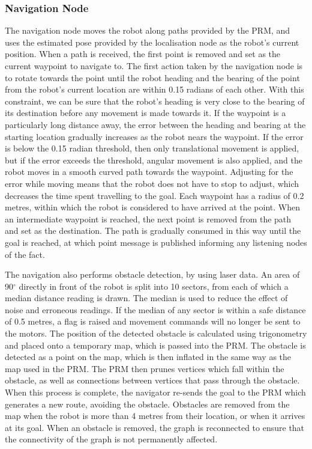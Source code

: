 \documentclass[conference]{IEEEtran}
\begin{document}
\subsubsection{Navigation Node}
The navigation node moves the robot along paths provided by the PRM, and uses the estimated pose provided by the localisation node as the robot's current position. When a path is received, the first point is removed and set as the current waypoint to navigate to. The first action taken by the navigation node is to rotate towards the point until the robot heading and the bearing of the point from the robot's current location are within 0.15 radians of each other. With this constraint, we can be sure that the robot's heading is very close to the bearing of its destination before any movement is made towards it. If the waypoint is a particularly long distance away, the error between the heading and bearing at the starting location gradually increases as the robot nears the waypoint. If the error is below the 0.15 radian threshold, then only translational movement is applied, but if the error exceeds the threshold, angular movement is also applied, and the robot moves in a smooth curved path towards the waypoint. Adjusting for the error while moving means that the robot does not have to stop to adjust, which decreases the time spent travelling to the goal. Each waypoint has a radius of 0.2 metres, within which the robot is considered to have arrived at the point. When an intermediate waypoint is reached, the next point is removed from the path and set as the destination. The path is gradually consumed in this way until the goal is reached, at which point message is published informing any listening nodes of the fact.

The navigation also performs obstacle detection, by using laser data. An area of 90$^\circ$ directly in front of the robot is split into 10 sectors, from each of which a median distance reading is drawn. The median is used to reduce the effect of noise and erroneous readings. If the median of any sector is within a safe distance of 0.5 metres, a flag is raised and movement commands will no longer be sent to the motors. The position of the detected obstacle is calculated using trigonometry and placed onto a temporary map, which is passed into the PRM. The obstacle is detected as a point on the map, which is then inflated in the same way as the map used in the PRM. The PRM then prunes vertices which fall within the obstacle, as well as connections between vertices that pass through the obstacle. When this process is complete, the navigator re-sends the goal to the PRM which generates a new route, avoiding the obstacle. Obstacles are removed from the map when the robot is more than 4 metres from their location, or when it arrives at its goal. When an obstacle is removed, the graph is reconnected to ensure that the connectivity of the graph is not permanently affected.
\end{document}
